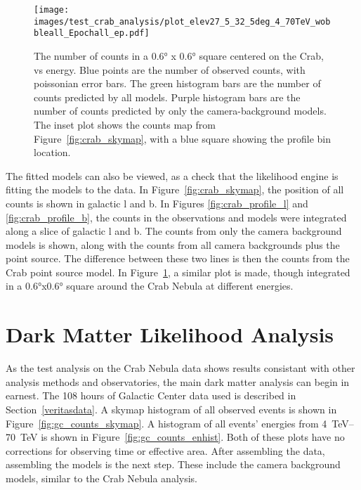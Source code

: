  \begin{figure}[h]
    \centering
    \texttt{[image: images/test\_crab\_analysis/plot\_elev27\_5\_32\_5deg\_4\_70TeV\_wobbleall\_Epochall\_ep.pdf]}
    \caption[Crab Profile in Energy]
    {
      The number of counts in a \ang{0.6} x \ang{0.6} square centered on the Crab, vs energy.
      Blue points are the number of observed counts, with poissonian error bars.
      The green histogram bars are the number of counts predicted by all models.
      Purple histogram bars are the number of counts predicted by only the camera-background models.
      The inset plot shows the counts map from Figure~\ref{fig:crab_skymap}, with a blue square showing the profile bin location.
    }
    \label{fig:crab_profile_energy}
  \end{figure}
    
  The fitted models can also be viewed, as a check that the likelihood engine is fitting the models to the data.
  In Figure~\ref{fig:crab_skymap}, the position of all counts is shown in galactic l and b.
  In Figures \ref{fig:crab_profile_l} and \ref{fig:crab_profile_b}, the counts in the observations and models were integrated along a slice of galactic l and b.
  The counts from only the camera background models is shown, along with the counts from all camera backgrounds plus the point source.
  The difference between these two lines is then the counts from the Crab point source model.
  In Figure~\ref{fig:crab_profile_energy}, a similar plot is made, though integrated in a \ang{0.6}x\ang{0.6} square around the Crab Nebula at different energies.

  \FloatBarrier

\section{Dark Matter Likelihood Analysis}\label{sec:dmlike}
  
  As the test analysis on the Crab Nebula data shows results consistant with other analysis methods and observatories, the main dark matter analysis can begin in earnest.
  The 108 hours of Galactic Center data used is described in Section~\ref{veritasdata}.
  A skymap histogram of all observed events is shown in Figure~\ref{fig:gc_counts_skymap}.
  A histogram of all events' energies from \SIrange{4}{70}{TeV} is shown in Figure~\ref{fig:gc_counts_enhist}.
  Both of these plots have no corrections for observing time or effective area.
  After assembling the data, assembling the models is the next step.
  These include the camera background models, similar to the Crab Nebula analysis.
  
